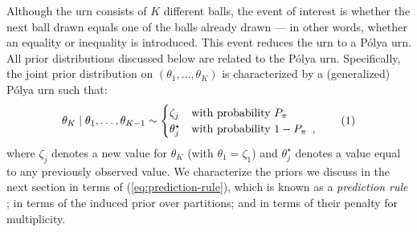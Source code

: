\documentclass[11pt,a4paper]{article}
\theoremstyle{definition} %
\theoremstyle{case}
\newcommand{\numberthis}{\addtocounter{equation}{1}\tag{\theequation}}
\newcommand{\FD}[1]{\textcolor{red}{Fabian: #1 }}
\begin{document}
Although the urn consists of $K$ different balls, the event of interest is whether the next ball drawn equals one of the balls already drawn --- in other words, whether an equality or inequality is introduced. This event reduces the urn to a P\'{o}lya urn. All prior distributions discussed below are related to the P\'{o}lya urn. Specifically, the joint prior distribution on $(\theta_1, \ldots, \theta_K)$ is characterized by a (generalized) P\'{o}lya urn such that:
\begin{equation} \label{eq:prediction-rule}
    \theta_K \mid \theta_1, \ldots, \theta_{K - 1} \sim \begin{cases}
    \zeta_j & \text{with probability } P_{\pi} \\
    \theta_j^{\star} & \text{with probability }  1- P_{\pi} \enspace ,
    \end{cases} \numberthis
\end{equation}
where $\zeta_j$ denotes a new value for $\theta_K$ (with $\theta_1 = \zeta_1$) and $\theta_j^{\star}$ denotes a value equal to any previously observed value. We characterize the priors we discuss in the next section in terms of (\ref{eq:prediction-rule}), which is known as a \textit{prediction rule} \parencite[e.g.,][]{ishwaran2001gibbs}; in terms of the induced prior over partitions; and in terms of their penalty for multiplicity.



\end{document}
